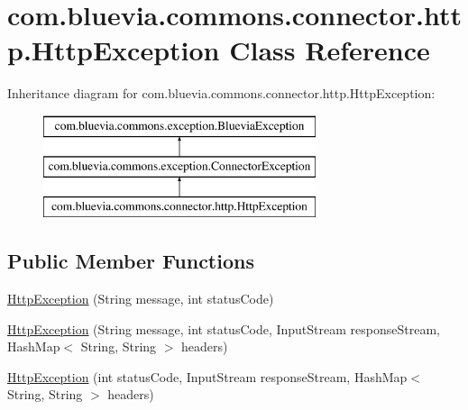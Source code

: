 \hypertarget{classcom_1_1bluevia_1_1commons_1_1connector_1_1http_1_1HttpException}{
\section{com.bluevia.commons.connector.http.HttpException Class Reference}
\label{classcom_1_1bluevia_1_1commons_1_1connector_1_1http_1_1HttpException}
}
Inheritance diagram for com.bluevia.commons.connector.http.HttpException:\begin{figure}[H]
\begin{center}
\leavevmode
\includegraphics[height=3.000000cm]{classcom_1_1bluevia_1_1commons_1_1connector_1_1http_1_1HttpException}
\end{center}
\end{figure}
\subsection*{Public Member Functions}
\begin{DoxyCompactItemize}
\item 
\hyperlink{classcom_1_1bluevia_1_1commons_1_1connector_1_1http_1_1HttpException_a778505bb6b94f776acea2af629144d5a}{HttpException} (String message, int statusCode)
\item 
\hyperlink{classcom_1_1bluevia_1_1commons_1_1connector_1_1http_1_1HttpException_a087b26899e5fd631bb2c9202ea836b2e}{HttpException} (String message, int statusCode, InputStream responseStream, HashMap$<$ String, String $>$ headers)
\item 
\hyperlink{classcom_1_1bluevia_1_1commons_1_1connector_1_1http_1_1HttpException_a5a5077553b197a59d17ca46203035f49}{HttpException} (int statusCode, InputStream responseStream, HashMap$<$ String, String $>$ headers)
\end{DoxyCompactItemize}
